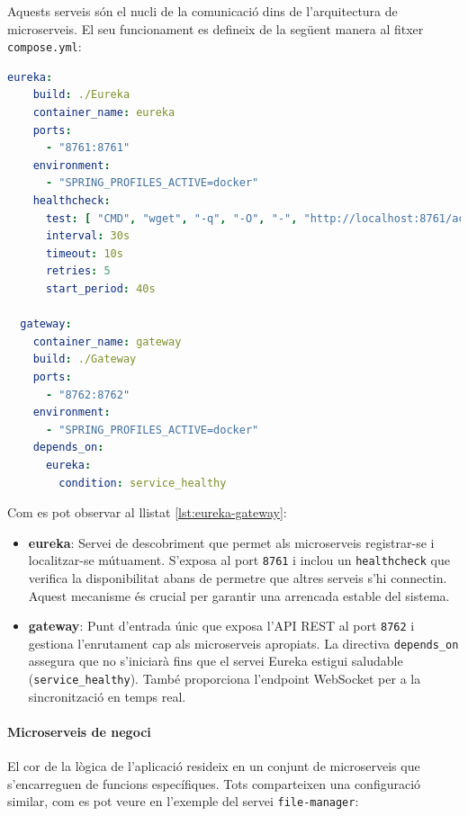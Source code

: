 Aquests serveis són el nucli de la comunicació dins de l'arquitectura de microserveis. El seu funcionament es defineix de la següent manera al fitxer \texttt{compose.yml}:

\begin{lstlisting}[language=yaml, caption={Definició d'Eureka i Gateway a compose.yml}, label={lst:eureka-gateway}]
  eureka:
    build: ./Eureka
    container_name: eureka
    ports:
      - "8761:8761"
    environment:
      - "SPRING_PROFILES_ACTIVE=docker"
    healthcheck:
      test: [ "CMD", "wget", "-q", "-O", "-", "http://localhost:8761/actuator/health"]
      interval: 30s
      timeout: 10s
      retries: 5
      start_period: 40s

  gateway:
    container_name: gateway
    build: ./Gateway
    ports:
      - "8762:8762"
    environment:
      - "SPRING_PROFILES_ACTIVE=docker"
    depends_on:
      eureka:
        condition: service_healthy
\end{lstlisting}

Com es pot observar al llistat \ref{lst:eureka-gateway}:

\begin{itemize}
  \item \textbf{eureka}: Servei de descobriment que permet als microserveis registrar-se i localitzar-se mútuament. S'exposa al port \texttt{8761} i inclou un \texttt{healthcheck} que verifica la disponibilitat abans de permetre que altres serveis s'hi connectin. Aquest mecanisme és crucial per garantir una arrencada estable del sistema.
  
  \item \textbf{gateway}: Punt d'entrada únic que exposa l'API REST al port \texttt{8762} i gestiona l'enrutament cap als microserveis apropiats. La directiva \texttt{depends\_on} assegura que no s'iniciarà fins que el servei Eureka estigui saludable (\texttt{service\_healthy}). També proporciona l'endpoint WebSocket per a la sincronització en temps real.
\end{itemize}

\paragraph{Microserveis de negoci}

El cor de la lògica de l'aplicació resideix en un conjunt de microserveis que s'encarreguen de funcions específiques. Tots comparteixen una configuració similar, com es pot veure en l'exemple del servei \texttt{file-manager}:

